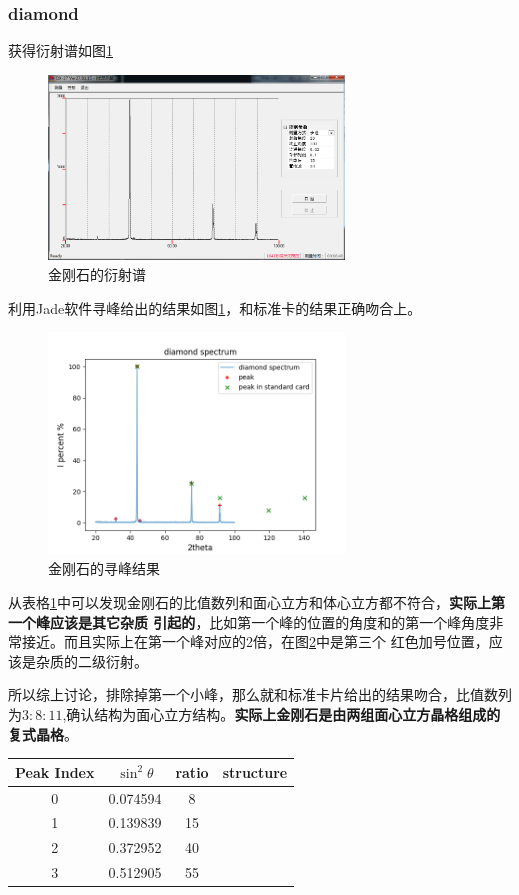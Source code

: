 \documentclass[10pt]{ctexart}
\begin{document}
\subsubsection{diamond}
获得衍射谱如图\ref{fig:diamond}
\begin{figure}
    \centering
    \includegraphics[width=0.7\textwidth]{data/diamond/diamond.png}
    \caption{金刚石的衍射谱}
    \label{fig:diamond}
\end{figure}
利用Jade软件寻峰给出的结果如图\ref{fig:diamond}，和标准卡的结果正确吻合上。
\begin{figure}
    \centering
    \includegraphics[width=0.7\textwidth]{data/diamond/spectrum.png}
    \caption{金刚石的寻峰结果}
    \label{fig:diamondJadespec}
\end{figure}
从表格\ref{tab:diamondPeakRatio}中可以发现金刚石的比值数列和面心立方和体心立方都不符合，\textbf{实际上第一个峰应该是其它杂质
引起的}，比如第一个峰的位置的角度和的第一个峰角度非常接近。而且实际上在第一个峰对应的2倍，在图\ref{fig:diamondJadespec}中是第三个
红色加号位置，应该是杂质的二级衍射。

所以综上讨论，排除掉第一个小峰，那么就和标准卡片给出的结果吻合，比值数列为$3:8:11$,确认结构为面心立方结构。\textbf{实际上金刚石是由两组面心立方晶格组成的复式晶格\cite{gutiPhys}}。
\begin{table}
    \begin{tabular}{|c|c|c|c|}
        \textbf{Peak Index} & \textbf{$\sin^2{\theta}$}& \textbf{ratio}& \textbf{structure}\\
        \hline
        0  &  0.074594&8&\\
    1   & 0.139839&15&\\
    2  &  0.372952&40&\\
    3  &  0.512905&55&\\
    \end{tabular}
    \centering
    \label{tab:diamondPeakRatio}
\end{table}
\end{document}
